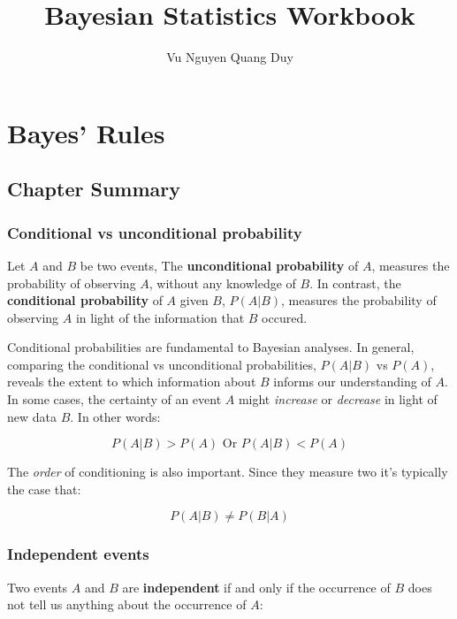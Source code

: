 \documentclass[
  letterpaper,
  DIV=11,
  numbers=noendperiod]{scrartcl}
\title{Bayesian Statistics Workbook}
\author{Vu Nguyen Quang Duy}
\date{}
\renewcommand*\contentsname{Table of contents}
\newcommand\contentsname{Table of contents}
\theoremstyle{definition}
\theoremstyle{remark}
\begin{document}
\maketitle

\renewcommand*\contentsname{Table of contents}
{
\hypersetup{linkcolor=}
\setcounter{tocdepth}{3}
\tableofcontents
}

\section{Bayes' Rules}\label{bayes-rules}

\subsection{Chapter Summary}\label{chapter-summary}

\subsubsection{Conditional vs unconditional
probability}\label{conditional-vs-unconditional-probability}

Let \(A\) and \(B\) be two events, The \textbf{unconditional
probability} of \(A\), measures the probability of observing \(A\),
without any knowledge of \(B\). In contrast, the \textbf{conditional
probability} of \(A\) given \(B\), \(P(A|B)\), measures the probability
of observing \(A\) in light of the information that \(B\) occured.

Conditional probabilities are fundamental to Bayesian analyses. In
general, comparing the conditional vs unconditional probabilities,
\(P(A|B)\) vs \(P(A)\), reveals the extent to which information about
\(B\) informs our understanding of \(A\). In some cases, the certainty
of an event \(A\) might \emph{increase} or \emph{decrease} in light of
new data \(B\). In other words:

\[
P(A|B) > P(A) \text{ Or } P(A|B) < P(A)
\]

The \emph{order} of conditioning is also important. Since they measure
two it's typically the case that:

\[
P(A|B) \neq P(B|A)
\]

\subsubsection{Independent events}\label{independent-events}

Two events \(A\) and \(B\) are \textbf{independent} if and only if the
occurrence of \(B\) does not tell us anything about the occurrence of
\(A\):
\end{document}
